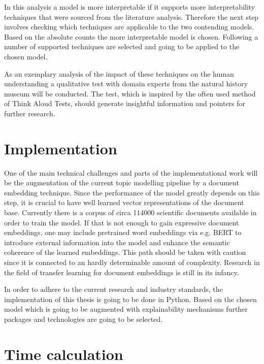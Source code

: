 \documentclass[pdftex,a4paper,12pt]{scrartcl}
\begin{document}
In this analysis a model is more interpretable if it supports more interpretability techniques that were sourced from the literature analysis. Therefore the next step involves checking which techniques are applicable to the two contending models. Based on the absolute counts the more interpretable model is chosen. Following a number of supported techniques are selected and going to be applied to the chosen model.

As an exemplary analysis of the impact of these techniques on the human understanding a qualitative test with domain experts from the natural history museum will be conducted. The test, which is inspired by the often used method of Think Aloud Tests, should generate insightful information and pointers for further research.



\section{Implementation}

One of the main technical challenges and parts of the implementational work will be the augmentation of the current topic modelling pipeline by a document embedding technique. Since the performance of the model greatly depends on this step, it is crucial to have well learned vector representations of the document base. Currently there is a corpus of circa 114000 scientific documents available in order to train the model. If that is not enough to gain expressive document embeddings, one may include pretrained word embeddings via e.g. BERT \cite{devlinBERTPretrainingDeep2018} to introduce external information into the model and enhance the semantic coherence of the learned embeddings. This path should be taken with caution since it is connected to an hardly determinable amount of complexity. Research in the field of transfer learning for document embeddings is still in its infancy.

In order to adhere to the current research and industry standards, the implementation of this thesis is going to be done in Python. Based on the chosen model which is going to be augmented with explainability mechanisms further packages and technologies are going to be selected.

\section{Time calculation}
\end{document}
